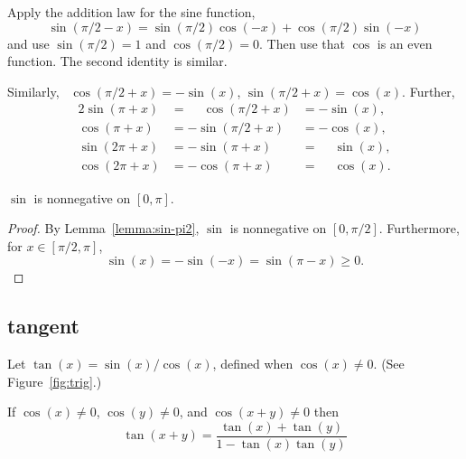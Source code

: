 \begin{proved}
Apply the addition law for the sine function,
\[ 
\sin(\pi/2 - x) = \sin(\pi/2)\cos(-x) + \cos(\pi/2)\sin(-x)
\] 
and use $\sin(\pi/2) = 1$ and
$\cos(\pi/2) = 0$.  Then use that $\cos$ is an
even function.  The second identity is
similar.  \swallowed\end{proved}

Similarly,~%
$\cos(\pi/2 + x) =
-\sin(x)$, $\sin(\pi/2 + x) = \cos(x)$.  Further,
\begin{alignat}{2}
\label{eqn:periodic}
\sin(\pi + x) &= \phantom{-}\cos(\pi/2 + x) &= -\sin(x),\nonumber\\
\cos(\pi + x) &= -\sin(\pi/2 + x) &= -\cos(x),\nonumber\\
\sin(2\pi + x) &= -\sin(\pi + x) &= \phantom{-}\sin(x),\\
\cos(2\pi + x) &= -\cos(\pi + x) &= \phantom{-}\cos(x)\nonumber.
\end{alignat}
%
%
%

\begin{lemma}[]\label{lemma:sin-pos}
$\sin$ is nonnegative on $[0,\pi]$.
\end{lemma}

\begin{proof} By Lemma~\ref{lemma:sin-pi2}, $\sin$ is nonnegative on
  $[0,\pi/2]$.  Furthermore, for $x\in[\pi/2,\pi]$,
\[ 
  \sin(x) = -\sin(-x)   =  \sin(\pi-x) \ge 0.
\] 
\end{proof}



\subsection{tangent}
\label{sec:tangent}

\begin{definition}[tangent]\label{def:tan}
Let $\tan(x) = \sin(x)/\cos(x)$, defined when $\cos(x)\ne0$.
(See Figure~\ref{fig:trig}.)
%
%
\end{definition}



\begin{lemma}[]
\label{lemma:tan-add}
If $\cos(x)\ne 0$, $\cos(y)\ne 0$, and $\cos(x+y)\ne0$ then
\[ \tan(x+y) = \frac{\tan(x) + \tan(y) }{ 1 -
    \tan(x)\tan(y)}\] 
\end{lemma}
%

